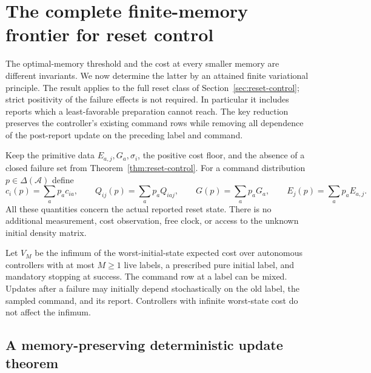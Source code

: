 \section{The complete finite-memory frontier for reset control}
\label{sec:r78-reset-frontier}

The optimal-memory threshold and the cost at every smaller memory are
different invariants.  We now determine the latter by an attained finite
variational principle.  The result applies to the full reset class of
Section~\ref{sec:reset-control}; strict positivity of the failure effects
is not required.  In particular it includes reports which a least-favorable
preparation cannot reach.  The key reduction preserves the controller's
existing command rows while removing all dependence of the post-report
update on the preceding label and command.

Keep the primitive data $E_{a,j},G_a,\sigma_i$, the positive cost floor,
and the absence of a closed failure set from
Theorem~\ref{thm:reset-control}.  For a command distribution
$p\in\Delta(\mathcal A)$ define
\[
 c_i(p)=\sum_a p_a c_{ia},\qquad
 Q_{ij}(p)=\sum_a p_a Q_{iaj},\qquad
 G(p)=\sum_a p_aG_a,\qquad E_j(p)=\sum_a p_aE_{a,j}.
\]
All these quantities concern the actual reported reset state.  There is
no additional measurement, cost observation, free clock, or access to the
unknown initial density matrix.

Let $V_M$ be the infimum of the worst-initial-state expected cost over
autonomous controllers with at most $M\ge1$ live labels, a prescribed
pure initial label, and mandatory stopping at success.  The command row
at a label can be mixed.  Updates after a failure may initially depend
stochastically on the old label, the sampled command, and its report.
Controllers with infinite worst-state cost do not affect the infimum.

\subsection{A memory-preserving deterministic update theorem}

